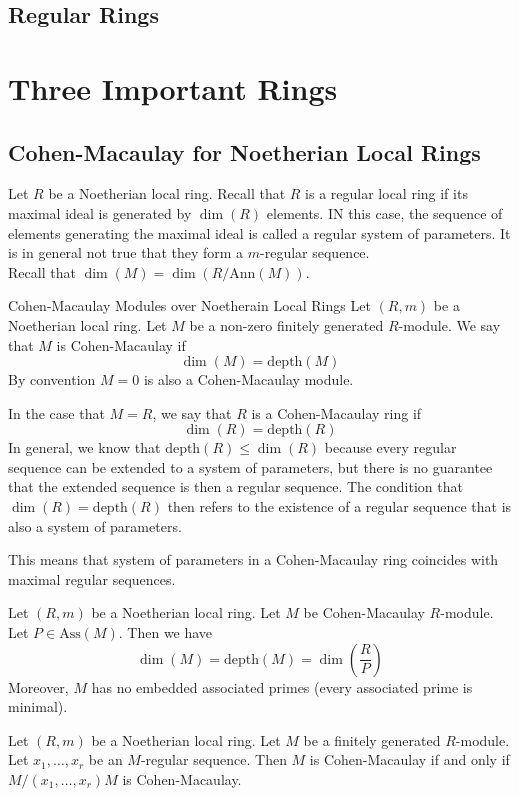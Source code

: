 \documentclass[a4paper]{article}
\begin{document}
\subsection{Regular Rings}

\pagebreak
\section{Three Important Rings}
\subsection{Cohen-Macaulay for Noetherian Local Rings}
Let $R$ be a Noetherian local ring. Recall that $R$ is a regular local ring if its maximal ideal is generated by $\dim(R)$ elements. IN this case, the sequence of elements generating the maximal ideal is called a regular system of parameters. It is in general not true that they form a $m$-regular sequence. \\

Recall that $\dim(M)=\dim(R/\text{Ann}(M))$. 

\begin{defn}{Cohen-Macaulay Modules over Noetherain Local Rings}{} Let $(R,m)$ be a Noetherian local ring. Let $M$ be a non-zero finitely generated $R$-module. We say that $M$ is Cohen-Macaulay if $$\dim(M)=\text{depth}(M)$$ By convention $M=0$ is also a Cohen-Macaulay module. 
\end{defn}

In the case that $M=R$, we say that $R$ is a Cohen-Macaulay ring if $$\dim(R)=\text{depth}(R)$$ In general, we know that $\text{depth}(R)\leq\dim(R)$ because every regular sequence can be extended to a system of parameters, but there is no guarantee that the extended sequence is then a regular sequence. The condition that $\dim(R)=\text{depth}(R)$ then refers to the existence of a regular sequence that is also a system of parameters. 

This means that system of parameters in a Cohen-Macaulay ring coincides with maximal regular sequences. 

\begin{prp}{}{} Let $(R,m)$ be a Noetherian local ring. Let $M$ be Cohen-Macaulay $R$-module. Let $P\in\text{Ass}(M)$. Then we have $$\dim(M)=\text{depth}(M)=\dim\left(\frac{R}{P}\right)$$ Moreover, $M$ has no embedded associated primes (every associated prime is minimal). 
\end{prp}

\begin{prp}{}{} Let $(R,m)$ be a Noetherian local ring. Let $M$ be a finitely generated $R$-module. Let $x_1,\dots,x_r$ be an $M$-regular sequence. Then $M$ is Cohen-Macaulay if and only if $M/(x_1,\dots,x_r)M$ is Cohen-Macaulay. 
\end{prp}
\end{document}
